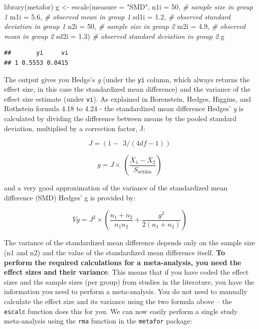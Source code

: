 \documentclass[
  oneside]{book}
\newenvironment{Shaded}{\begin{snugshade}}{\end{snugshade}}
\newcommand{\AttributeTok}[1]{\textcolor[rgb]{0.77,0.63,0.00}{#1}}
\newcommand{\CommentTok}[1]{\textcolor[rgb]{0.56,0.35,0.01}{\textit{#1}}}
\newcommand{\DecValTok}[1]{\textcolor[rgb]{0.00,0.00,0.81}{#1}}
\newcommand{\FloatTok}[1]{\textcolor[rgb]{0.00,0.00,0.81}{#1}}
\newcommand{\FunctionTok}[1]{\textcolor[rgb]{0.00,0.00,0.00}{#1}}
\newcommand{\NormalTok}[1]{#1}
\newcommand{\OtherTok}[1]{\textcolor[rgb]{0.56,0.35,0.01}{#1}}
\newcommand{\StringTok}[1]{\textcolor[rgb]{0.31,0.60,0.02}{#1}}
\begin{document}
\begin{Shaded}
\begin{Highlighting}[]
\FunctionTok{library}\NormalTok{(metafor)}
\NormalTok{g }\OtherTok{\textless{}{-}} \FunctionTok{escalc}\NormalTok{(}\AttributeTok{measure =} \StringTok{"SMD"}\NormalTok{,}
            \AttributeTok{n1i =} \DecValTok{50}\NormalTok{, }\CommentTok{\# sample size in group 1}
            \AttributeTok{m1i =} \FloatTok{5.6}\NormalTok{, }\CommentTok{\# observed mean in group 1}
            \AttributeTok{sd1i =} \FloatTok{1.2}\NormalTok{, }\CommentTok{\# observed standard deviation in group 1}
            \AttributeTok{n2i =} \DecValTok{50}\NormalTok{, }\CommentTok{\# sample size in group 2}
            \AttributeTok{m2i =} \FloatTok{4.9}\NormalTok{, }\CommentTok{\# observed mean in group 2}
            \AttributeTok{sd2i =} \FloatTok{1.3}\NormalTok{) }\CommentTok{\# observed standard deviation in group 2}
\NormalTok{g}
\end{Highlighting}
\end{Shaded}

\begin{verbatim}
##       yi     vi 
## 1 0.5553 0.0415
\end{verbatim}

The output gives you Hedge's \emph{g} (under the \texttt{yi} column, which always returns the effect size, in this case the standardized mean difference) and the variance of the effect size estimate (under \texttt{vi}). As explained in Borenstein, Hedges, Higgins, and Rothstein formula 4.18 to 4.24 -\citet{borenstein_introduction_2009} the standardized mean difference Hedges' \emph{g} is calculated by dividing the difference between means by the pooled standard deviation, multiplied by a correction factor, J:

\[
J = (1 - \ \ 3/(4df - 1))
\]

\[
g = J \times \ \left( \frac{{\overline{X}}_{1} - {\overline{X}}_{2}}{S_{\text{within}}} \right)
\]

and a very good approximation of the variance of the standardized mean
difference (SMD) Hedges' g is provided by:

\[
Vg = J^{2} \times \left( \frac{n_{1} + n_{2}}{n_{1}n_{2}} + \frac{g^{2}}{2(n_{1} + n_{2})} \right)
\]

The variance of the standardized mean difference depends only on the sample size (n1 and n2) and the value of the standardized mean difference itself. \textbf{To perform the required calculations for a meta-analysis, you need the effect sizes and their variance}. This means that if you have coded the effect sizes and the sample sizes (per group) from studies in the literature, you have the information you need to perform a meta-analysis. You do not need to manually calculate the effect size and its variance using the two formula above -- the \texttt{escalc} function does this for you. We can now easily perform a single study meta-analysis using the \texttt{rma} function in the \texttt{metafor} package:
\end{document}
